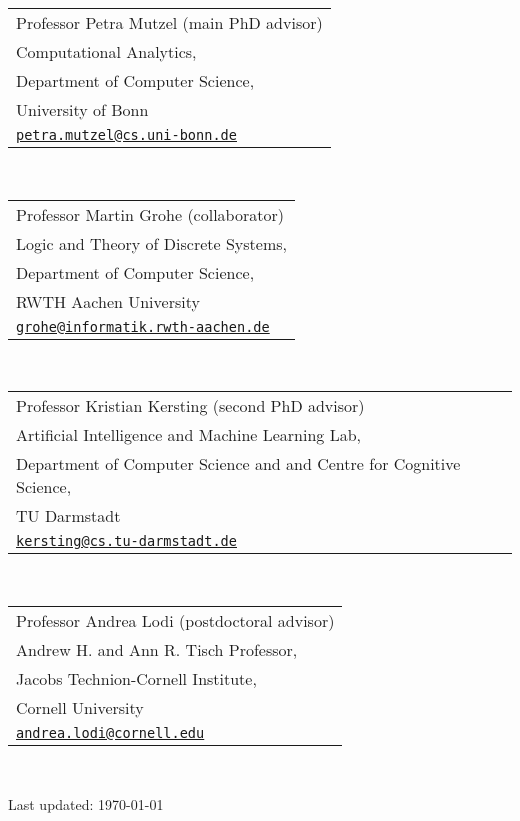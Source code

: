 \documentclass[11pt, a4paper, DIV=12]{scrartcl}
\begin{document}
\begin{tabular}{l}
	Professor Petra Mutzel (main PhD advisor)\\
	Computational Analytics,\\ 
	Department of Computer Science,\\
	University of Bonn \\
	\href{mailto:petra.mutzel@cs.uni-bonn.de}{\texttt{petra.mutzel@cs.uni-bonn.de}}\\
\end{tabular}\\[0.5em]


\begin{tabular}{l}
	Professor Martin Grohe (collaborator)\\
	Logic and Theory of Discrete Systems,\\ 
	Department of Computer Science,\\
	RWTH Aachen University \\
	\href{mailto:grohe@informatik.rwth-aachen.de}{\texttt{grohe@informatik.rwth-aachen.de}}\\
\end{tabular}\\[0.5em]

\begin{tabular}{l}
	Professor Kristian Kersting (second PhD advisor)\\ 
	Artificial Intelligence and Machine Learning Lab,\\
	Department of Computer Science and and Centre for Cognitive Science,\\
	TU Darmstadt\\
	\href{mailto:kersting@cs.tu-darmstadt.de}{\texttt{kersting@cs.tu-darmstadt.de}}\\
\end{tabular}\\[0.5em]

\begin{tabular}{l}
	Professor Andrea Lodi (postdoctoral advisor)\\
	Andrew H. and Ann R. Tisch Professor,\\
	Jacobs Technion-Cornell Institute,\\
	Cornell University\\
	\href{mailto:andrea.lodi@cornell.edu}{\texttt{andrea.lodi@cornell.edu}}\\
\end{tabular}\\[0.5em]



\vfill{} 
\begin{center}
{\scriptsize Last updated: \today}
\end{center}
\end{document}
